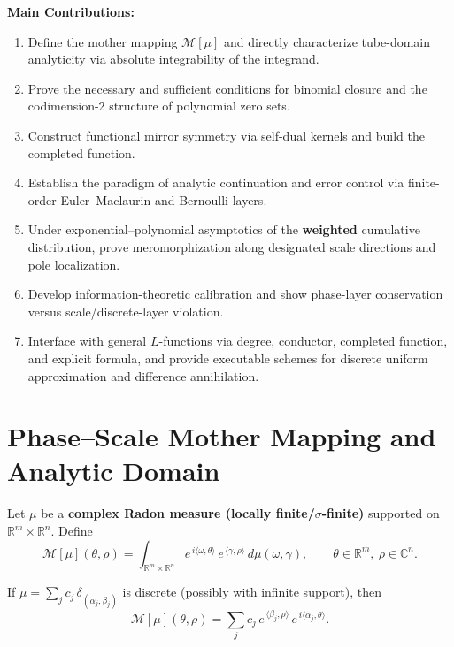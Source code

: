 \documentclass[11pt,a4paper]{article}
\theoremstyle{remark}
\begin{document}
\textbf{Main Contributions:}

\begin{enumerate}
\item Define the mother mapping $\mathcal{M}[\mu]$ and directly characterize tube-domain analyticity via absolute integrability of the integrand.
\item Prove the necessary and sufficient conditions for binomial closure and the codimension-2 structure of polynomial zero sets.
\item Construct functional mirror symmetry via self-dual kernels and build the completed function.
\item Establish the paradigm of analytic continuation and error control via finite-order Euler--Maclaurin and Bernoulli layers.
\item Under exponential--polynomial asymptotics of the \textbf{weighted} cumulative distribution, prove meromorphization along designated scale directions and pole localization.
\item Develop information-theoretic calibration and show phase-layer conservation versus scale/discrete-layer violation.
\item Interface with general $L$-functions via degree, conductor, completed function, and explicit formula, and provide executable schemes for discrete uniform approximation and difference annihilation.
\end{enumerate}

\section{Phase--Scale Mother Mapping and Analytic Domain}

Let $\mu$ be a \textbf{complex Radon measure (locally finite/$\sigma$-finite)} supported on $\mathbb{R}^m\times\mathbb{R}^n$. Define
\begin{equation}
\mathcal{M}[\mu](\theta,\rho)
=\int_{\mathbb{R}^m\times\mathbb{R}^n}
e^{\,i\langle\omega,\theta\rangle}\,e^{\,\langle\gamma,\rho\rangle}\,d\mu(\omega,\gamma),
\qquad \theta\in\mathbb{R}^m,\ \rho\in\mathbb{C}^n .
\end{equation}

If $\mu=\sum_j c_j\,\delta_{(\alpha_j,\beta_j)}$ is discrete (possibly with infinite support), then
\begin{equation}
\mathcal{M}[\mu](\theta,\rho)=\sum_j c_j\,e^{\,\langle\beta_j,\rho\rangle}\,e^{\,i\langle\alpha_j,\theta\rangle}.
\end{equation}
\end{document}
